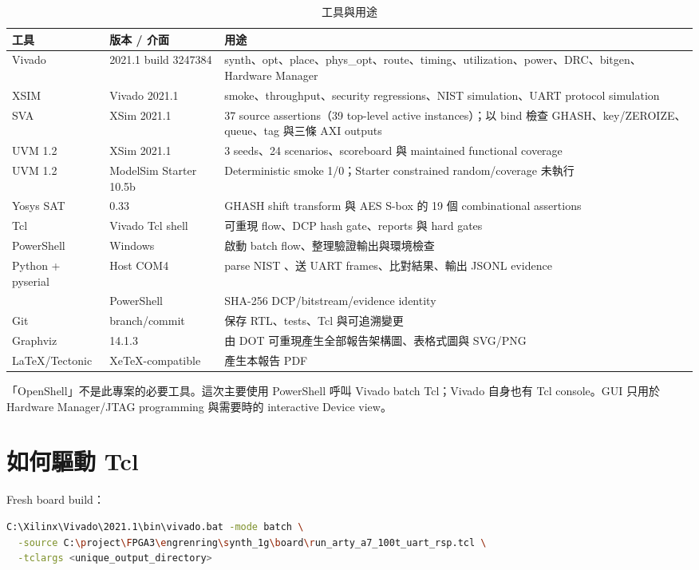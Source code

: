 \documentclass[UTF8,fontset=none,11pt,a4paper]{ctexrep}
\newcommand{\code}[1]{\texttt{\detokenize{#1}}}
\begin{document}
\begin{table}[H]
\centering
\caption{工具與用途}
\begin{tabularx}{\linewidth}{l l X}
\toprule
工具 & 版本 / 介面 & 用途 \\
\midrule
Vivado & 2021.1 build 3247384 & synth、opt、place、phys\_opt、route、timing、utilization、power、DRC、bitgen、Hardware Manager \\
XSIM & Vivado 2021.1 & smoke、throughput、security regressions、NIST simulation、UART protocol simulation \\
SVA & XSim 2021.1 & 37 source assertions（39 top-level active instances）；以 bind 檢查 GHASH、key/ZEROIZE、queue、tag 與三條 AXI outputs \\
UVM 1.2 & XSim 2021.1 & 3 seeds、24 scenarios、scoreboard 與 maintained functional coverage \\
UVM 1.2 & ModelSim Starter 10.5b & Deterministic smoke 1/0；Starter constrained random/coverage 未執行 \\
Yosys SAT & 0.33 & GHASH shift transform 與 AES S-box 的 19 個 combinational assertions \\
Tcl & Vivado Tcl shell & 可重現 flow、DCP hash gate、reports 與 hard gates \\
PowerShell & Windows & 啟動 batch flow、整理驗證輸出與環境檢查 \\
Python + pyserial & Host COM4 & parse NIST \code{.rsp}、送 UART frames、比對結果、輸出 JSONL evidence \\
\code{Get-FileHash} & PowerShell & SHA-256 DCP/bitstream/evidence identity \\
Git & branch/commit & 保存 RTL、tests、Tcl 與可追溯變更 \\
Graphviz & 14.1.3 & 由 DOT 可重現產生全部報告架構圖、表格式圖與 SVG/PNG \\
LaTeX/Tectonic & XeTeX-compatible & 產生本報告 PDF \\
\bottomrule
\end{tabularx}
\end{table}

「OpenShell」不是此專案的必要工具。這次主要使用 PowerShell 呼叫 Vivado batch Tcl；Vivado 自身也有 Tcl console。GUI 只用於 Hardware Manager/JTAG programming 與需要時的 interactive Device view。

\section{如何驅動 Tcl}

Fresh board build：
\begin{lstlisting}[language=bash]
C:\Xilinx\Vivado\2021.1\bin\vivado.bat -mode batch \
  -source C:\project\FPGA3\engrenring\synth_1g\board\run_arty_a7_100t_uart_rsp.tcl \
  -tclargs <unique_output_directory>
\end{lstlisting}
\end{document}
